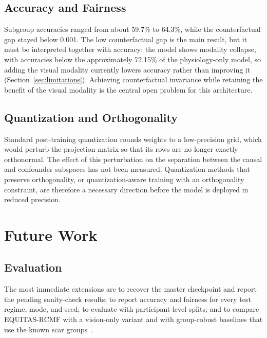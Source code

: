 \subsection{Accuracy and Fairness}
Subgroup accuracies ranged from about 59.7\% to 64.3\%, while the counterfactual gap stayed below 0.001. The low counterfactual gap is the main result, but it must be interpreted together with accuracy: the model shows modality collapse, with accuracies below the approximately 72.15\% of the physiology-only model, so adding the visual modality currently lowers accuracy rather than improving it (Section~\ref{sec:limitations}). Achieving counterfactual invariance while retaining the benefit of the visual modality is the central open problem for this architecture.

\subsection{Quantization and Orthogonality}
Standard post-training quantization rounds weights to a low-precision grid, which would perturb the projection matrix so that its rows are no longer exactly orthonormal. The effect of this perturbation on the separation between the causal and confounder subspaces has not been measured. Quantization methods that preserve orthogonality, or quantization-aware training with an orthogonality constraint, are therefore a necessary direction before the model is deployed in reduced precision.

\section{Future Work}
\subsection{Evaluation}
The most immediate extensions are to recover the master checkpoint and report the pending sanity-check results; to report accuracy and fairness for every test regime, mode, and seed; to evaluate with participant-level splits; and to compare EQUITAS-RCMF with a vision-only variant and with group-robust baselines that use the known scar groups~\cite{sagawa2020}.

